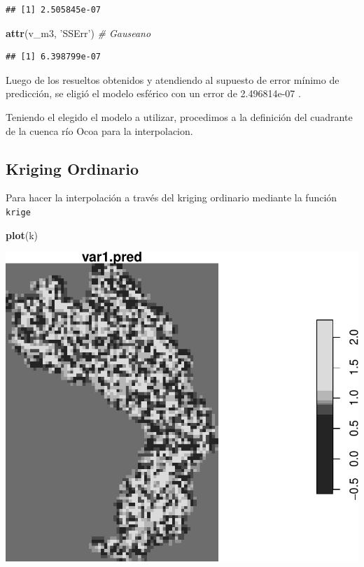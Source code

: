 \documentclass[11pt,]{article}
\newenvironment{Shaded}{\begin{snugshade}}{\end{snugshade}}
\newcommand{\KeywordTok}[1]{\textcolor[rgb]{0.13,0.29,0.53}{\textbf{#1}}}
\newcommand{\StringTok}[1]{\textcolor[rgb]{0.31,0.60,0.02}{#1}}
\newcommand{\CommentTok}[1]{\textcolor[rgb]{0.56,0.35,0.01}{\textit{#1}}}
\newcommand{\NormalTok}[1]{#1}
\begin{document}
\begin{verbatim}
## [1] 2.505845e-07
\end{verbatim}

\begin{Shaded}
\begin{Highlighting}[]
\KeywordTok{attr}\NormalTok{(v_m3, }\StringTok{'SSErr'}\NormalTok{) }\CommentTok{# Gauseano}
\end{Highlighting}
\end{Shaded}

\begin{verbatim}
## [1] 6.398799e-07
\end{verbatim}

Luego de los resueltos obtenidos y atendiendo al supuesto de error
mínimo de predicción, se eligió el modelo esférico con un error de
2.496814e-07 .

Teniendo el elegido el modelo a utilizar, procedimos a la definición del
cuadrante de la cuenca río Ocoa para la interpolacion.

\subsection{Kriging Ordinario}\label{kriging-ordinario}

Para hacer la interpolación a través del kriging ordinario mediante la
función \texttt{krige}

\begin{Shaded}
\begin{Highlighting}[]
\KeywordTok{plot}\NormalTok{(k)}
\end{Highlighting}
\end{Shaded}

\includegraphics{proyecto_f_files/figure-latex/unnamed-chunk-57-1.pdf}
\end{document}
